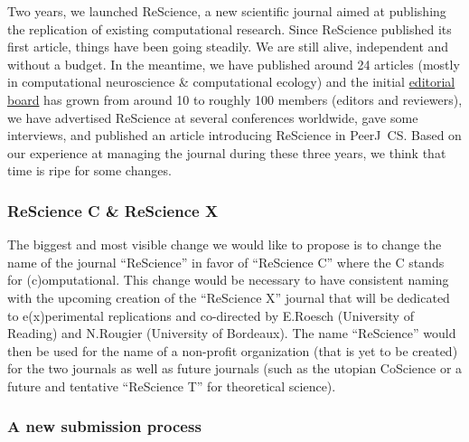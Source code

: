 













Two years, we launched ReScience, a new scientific journal aimed at publishing the
replication of existing computational research. Since ReScience published its first
article\supercite{Topalidou:2015}, things have been
going steadily. We are still alive, independent and without a budget. In the
meantime, we have published around 24 articles (mostly in computational
neuroscience \& computational ecology) and the initial
\href{https://rescience-c.github.io/board/}{editorial board} has grown from
around 10 to roughly 100 members (editors and reviewers), we have advertised
ReScience at several conferences worldwide, gave some
interviews\supercite{Science:2018}, and published an article introducing
ReScience in PeerJ~CS\supercite{Rougier:2017}. Based on our
experience\supercite{Rougier:2018} at managing the journal during these three
years, we think that time is ripe for some changes.

\subsubsection{ReScience C \& ReScience X}

The biggest and most visible change we would like to propose is to change the
name of the journal ``ReScience'' in favor of ``ReScience C'' where the C
stands for (c)omputational. This change would be necessary to have consistent
naming with the upcoming creation of the ``ReScience X'' journal that will be
dedicated to e(x)perimental replications and co-directed by E.Roesch
(University of Reading) and N.Rougier (University of Bordeaux). The name
``ReScience'' would then be used for the name of a non-profit organization
(that is yet to be created) for the two journals as well as future journals
(such as the utopian CoScience\supercite{Rougier:2017} or a future and
tentative ``ReScience T'' for theoretical science).


\subsubsection{A new submission process}

